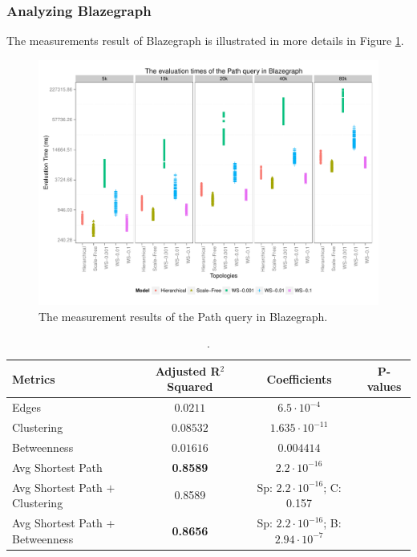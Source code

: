 \subsubsection{Analyzing Blazegraph}

The measurements result of Blazegraph is illustrated in more details in Figure \ref{fig:blazeq1}.
\begin{figure}[!ht]
	\centering
	\includegraphics[width=160mm, keepaspectratio]{figures/blaze_q1.pdf}
	\caption{The measurement results of the Path query in Blazegraph.}
	\label{fig:blazeq1}
\end{figure}

\begin{table}[ht]
	\footnotesize
	\centering
	
	\begin{tabular}{ l c c c}
		\toprule
		Metrics & Adjusted R$^2$ Squared & Coefficients & P-values\\ \hline
		Edges & $0.0211$ & $6.5 \cdot 10^{-4}$ \\ 
		Clustering & $0.08532 $ & $1.635 \cdot 10^{-11}$ \\ 
		Betweenness & $0.01616$ & $0.004414$ \\ 
		Avg Shortest Path & \textbf{0.8589} & $2.2 \cdot 10^{-16}$ \\ 
		Avg Shortest Path $+$ Clustering & 0.8589 & Sp: $2.2 \cdot 10^{-16}$; C: 0.157\\ 
		Avg Shortest Path + Betweenness & \textbf{0.8656} & Sp: $2.2 \cdot 10^{-16}$; B: $2.94 \cdot 10^{-7}$ \\
		
		\bottomrule
	\end{tabular}
	\caption{.}
	\label{tab:regressions_blaze_a1}
\end{table}

